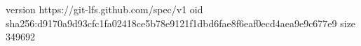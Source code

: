 version https://git-lfs.github.com/spec/v1
oid sha256:d9170a9d93cfc1fa02418ce5b78e9121f1dbd6fae8f6eaf0ecd4aea9e9c677e9
size 349692
